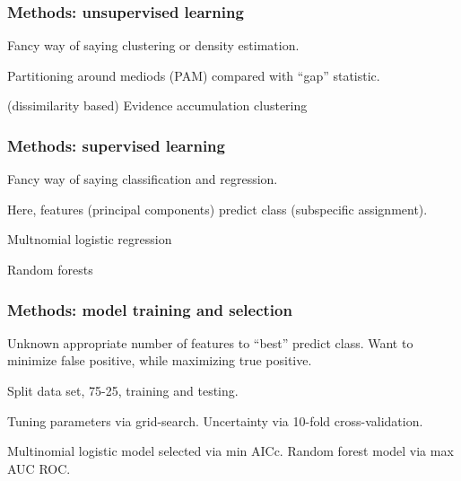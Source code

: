 \documentclass{beamer}\usepackage{graphicx, color}
\begin{document}
\begin{frame}
  \frametitle{Methods: unsupervised learning}

  Fancy way of saying clustering or density estimation.

  Partitioning around mediods (PAM) compared with ``gap'' statistic.

  (dissimilarity based) Evidence accumulation clustering
\end{frame}

\begin{frame}
  \frametitle{Methods: supervised learning}

  Fancy way of saying classification and regression.

  Here, features (principal components) predict class (subspecific assignment).

  Multnomial logistic regression

  Random forests
\end{frame}

\begin{frame}
  \frametitle{Methods: model training and selection}
  Unknown appropriate number of features to ``best'' predict class. Want to minimize false positive, while maximizing true positive.

  Split data set, 75-25, training and testing.

  Tuning parameters via grid-search. Uncertainty via 10-fold cross-validation.

  Multinomial logistic model selected via min AICc. Random forest model via max AUC ROC.

\end{frame}
\end{document}
